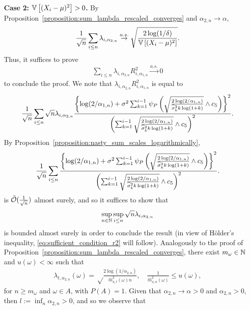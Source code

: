 \textbf{Case 2: $\mathbb{V} \left[ (X_i-\mu)^2\right] > 0$.} By Proposition~\ref{proposition:sum_lambda_rescaled_converges} and $\alpha_{2, n} \to \alpha$, 
\begin{align*}
    \frac{1}{\sqrt{n}}\sum_{i \leq n} \lambda_{i, \alpha_{2, n}} \stackrel{a.s.}{\to} \sqrt \frac{2 \log (1 / \delta)}{\mathbb{V} \left[ (X_i-\mu)^2\right]}.
\end{align*}
Thus, it suffices to prove
\begin{align} \label{eq:sufficient_condition_r2}
    \sum_{i \leq n} \lambda_{i, \alpha_{2, n}} R_{i, \alpha_{1,n}} ^2 \stackrel{a.s.}{\to} 0
\end{align}
to conclude the proof. We note that $\lambda_{i, \alpha_{2, n}} R_{i, \alpha_{1,n}} ^2$ is equal to
\begin{align*}
    \frac{1}{\sqrt n}\sum_{i \leq n} \sqrt{n} \lambda_{i, \alpha_{2, n}} \frac{\left\{ \log(2/\alpha_{1,n}) + \sigma^2\sum_{k=1}^{i-1} \psi_P\left(\sqrt\frac{2\log(2/\alpha_{1,n})}{\widehat \sigma_{k}^2 k \log (1+k)}\wedge c_5\right)\right\}^2}{\left( \sum_{k=1}^{i-1} \sqrt\frac{2\log(2/\alpha_{1,n})}{\widehat \sigma_{k}^2 k \log (1+k)} \wedge c_5\right)^2}.
\end{align*}
By Proposition~\ref{proposition:nasty_sum_scales_logarithmically},
\begin{align*}
    \frac{1}{\sqrt n}\sum_{i \leq n} \frac{\left\{ \log(2/\alpha_{1,n}) + \sigma^2\sum_{k=1}^{i-1} \psi_P\left(\sqrt\frac{2\log(2/\alpha_{1,n})}{\widehat \sigma_{k}^2 k \log (1+k)}\wedge c_5\right)\right\}^2}{\left( \sum_{k=1}^{i-1} \sqrt\frac{2\log(2/\alpha_{1,n})}{\widehat \sigma_{k}^2 k \log (1+k)} \wedge c_5\right)^2}.
\end{align*}
is $\tilde{\mathcal{O}} (\frac{1}{\sqrt n})$ almost surely, and so it suffices to show that
\begin{align*}
    \sup_{n\in\mathbb{N}}\sup_{i \leq n} \sqrt{n} \lambda_{i, \alpha_{2, n}}
\end{align*}
is bounded almost surely in order to conclude the result (in view of Hölder's inequality, \eqref{eq:sufficient_condition_r2} will follow). Analogously to the proof of Proposition~\ref{proposition:sum_lambda_rescaled_converges}, there exist $m_\omega \in \mathbb{N}$ and $u(\omega) < \infty$ such that
\begin{align*}
    \lambda_{t,\alpha_{2, n}}(\omega) = \sqrt\frac{2\log(1/\alpha_{2, n})}{\widehat m_{4, t}^2(\omega) n}, \quad \frac{1}{\widehat m_{4, n}^2(\omega)} \leq u(\omega),
\end{align*}
for $n \geq m_\omega$ and $\omega \in A$, with $P(A) = 1$.
Given that $\alpha_{2, n} \to \alpha > 0$ and $\alpha_{2, n} >0$, then $l := \inf_{n} \alpha_{2, n} > 0$, and so we observe that
